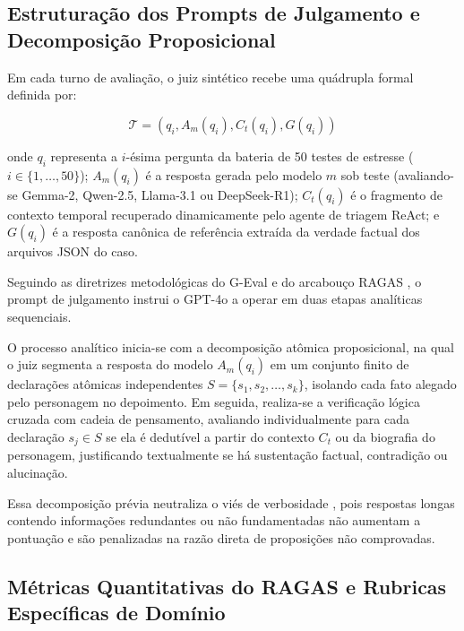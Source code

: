 \subsection{Estruturação dos Prompts de Julgamento e Decomposição Proposicional}
\label{subsec:met_prompt_juiz}

Em cada turno de avaliação, o juiz sintético recebe uma quádrupla formal definida por:

\begin{equation}
\mathcal{T} = \left( q_i, A_m(q_i), C_t(q_i), G(q_i) \right)
\label{eq:tupla_avaliacao}
\end{equation}

\noindent onde $q_i$ representa a $i$-ésima pergunta da bateria de 50 testes de estresse ($i \in \{1, \dots, 50\}$); $A_m(q_i)$ é a resposta gerada pelo modelo $m$ sob teste (avaliando-se Gemma-2, Qwen-2.5, Llama-3.1 ou DeepSeek-R1); $C_t(q_i)$ é o fragmento de contexto temporal recuperado dinamicamente pelo agente de triagem ReAct; e $G(q_i)$ é a resposta canônica de referência extraída da verdade factual dos arquivos JSON do caso.

Seguindo as diretrizes metodológicas do G-Eval \cite{liu2023geval} e do arcabouço RAGAS \cite{es2024ragas}, o prompt de julgamento instrui o GPT-4o a operar em duas etapas analíticas sequenciais.

O processo analítico inicia-se com a decomposição atômica proposicional, na qual o juiz segmenta a resposta do modelo $A_m(q_i)$ em um conjunto finito de declarações atômicas independentes $S = \{s_1, s_2, \dots, s_k\}$, isolando cada fato alegado pelo personagem no depoimento. Em seguida, realiza-se a verificação lógica cruzada com cadeia de pensamento, avaliando individualmente para cada declaração $s_j \in S$ se ela é dedutível a partir do contexto $C_t$ ou da biografia do personagem, justificando textualmente se há sustentação factual, contradição ou alucinação.

Essa decomposição prévia neutraliza o viés de verbosidade \cite{gu2024survey}, pois respostas longas contendo informações redundantes ou não fundamentadas não aumentam a pontuação e são penalizadas na razão direta de proposições não comprovadas.

\subsection[Métricas Quantitativas e Rubricas de Domínio]{Métricas Quantitativas do RAGAS e Rubricas Específicas de Domínio}
\label{subsec:met_rubricas_dominio}

